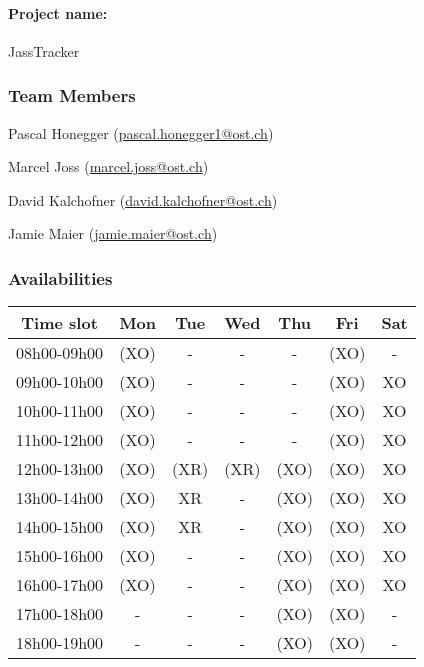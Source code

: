 \paragraph{Project name:} JassTracker

\subsubsection*{Team Members}

\begin{compactenum}
    \item Pascal Honegger (\href{mailto:pascal.honegger1@ost.ch}{pascal.honegger1@ost.ch})
    \item Marcel Joss (\href{mailto:marcel.joss@ost.ch}{marcel.joss@ost.ch})
    \item David Kalchofner (\href{mailto:david.kalchofner@ost.ch}{david.kalchofner@ost.ch})
    \item Jamie Maier (\href{mailto:jamie.maier@ost.ch}{jamie.maier@ost.ch})
\end{compactenum}

\subsubsection*{Availabilities}


\begin{flushleft}
    \begin{tabular}{|c|c|c|c|c|c|c|}
        \hline
        Time slot   & Mon  & Tue  & Wed  & Thu & Fri   & Sat \\ \hline
        08h00-09h00 & (XO) &  -   &  -   &  -  & (XO)  &  -  \\ \hline
        09h00-10h00 & (XO) &  -   &  -   &  -  & (XO)  & XO  \\ \hline
        10h00-11h00 & (XO) &  -   &  -   &  -  & (XO)  & XO  \\ \hline
        11h00-12h00 & (XO) &  -   &  -   &  -  & (XO)  & XO  \\ \hline
        \rowcolor[HTML]{EFEFEF}
        12h00-13h00 & (XO) & (XR) & (XR) & (XO) & (XO) & XO  \\ \hline
        13h00-14h00 & (XO) & XR   &  -   & (XO) & (XO) & XO  \\ \hline
        14h00-15h00 & (XO) & XR   &  -   & (XO) & (XO) & XO  \\ \hline
        15h00-16h00 & (XO) &  -   &  -   & (XO) & (XO) & XO  \\ \hline
        16h00-17h00 & (XO) &  -   &  -   & (XO) & (XO) & XO  \\ \hline
        \rowcolor[HTML]{EFEFEF}
        17h00-18h00 &  -   &  -   &  -   & (XO)  & (XO) &  -  \\ \hline
        \rowcolor[HTML]{EFEFEF}
        18h00-19h00 &  -   &  -   &  -   & (XO) & (XO) &  -  \\ \hline
    \end{tabular}

\end{flushleft}


